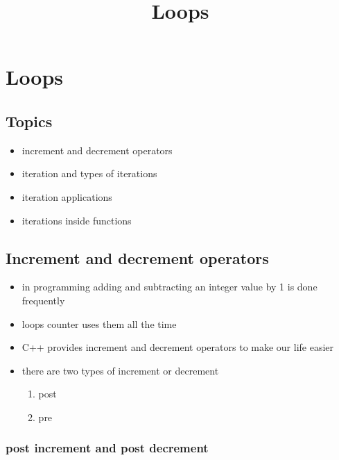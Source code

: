 \documentclass[11pt]{article}
\title{Loops}
\providecommand{\tightlist}{%
      \setlength{\itemsep}{0pt}\setlength{\parskip}{0pt}}
\begin{document}
    
    \maketitle
    
    

    
    \hypertarget{loops}{%
\section{Loops}\label{loops}}

\hypertarget{topics}{%
\subsection{Topics}\label{topics}}

\begin{itemize}
\tightlist
\item
  increment and decrement operators
\item
  iteration and types of iterations
\item
  iteration applications
\item
  iterations inside functions
\end{itemize}

\hypertarget{increment-and-decrement-operators}{%
\subsection{Increment and decrement
operators}\label{increment-and-decrement-operators}}

\begin{itemize}
\tightlist
\item
  in programming adding and subtracting an integer value by 1 is done
  frequently
\item
  loops counter uses them all the time
\item
  C++ provides increment and decrement operators to make our life easier
\item
  there are two types of increment or decrement

  \begin{enumerate}
  \def\labelenumi{\arabic{enumi}.}
  \tightlist
  \item
    post
  \item
    pre
  \end{enumerate}
\end{itemize}

\hypertarget{post-increment-and-post-decrement}{%
\subsubsection{post increment and post
decrement}\label{post-increment-and-post-decrement}}
\end{document}

